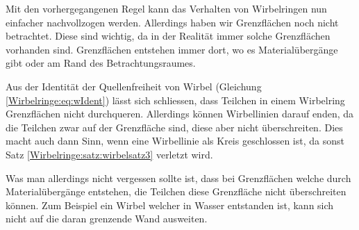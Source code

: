 Mit den vorhergegangenen Regel kann das Verhalten von Wirbelringen nun einfacher nachvollzogen werden.
Allerdings haben wir Grenzflächen noch nicht betrachtet.
Diese sind wichtig, da in der Realität immer solche Grenzflächen vorhanden sind.
Grenzflächen entstehen immer dort, wo es Materialübergänge gibt oder am Rand des Betrachtungsraumes.

Aus der Identität der Quellenfreiheit von Wirbel (Gleichung \eqref{Wirbelringe:eq:wIdent}) lässt sich schliessen, dass Teilchen in einem Wirbelring Grenzflächen nicht durchqueren.
Allerdings können Wirbellinien darauf enden, da die Teilchen zwar auf der Grenzfläche sind, diese aber nicht überschreiten.
Dies macht auch dann Sinn, wenn eine Wirbellinie als Kreis geschlossen ist, da sonst Satz \ref{Wirbelringe:satz:wirbelsatz3} verletzt wird.

Was man allerdings nicht vergessen sollte ist, dass bei Grenzflächen welche durch Materialübergänge entstehen, die Teilchen diese Grenzfläche nicht überschreiten können.
Zum Beispiel ein Wirbel welcher in Wasser entstanden ist, kann sich nicht auf die daran grenzende Wand ausweiten.
